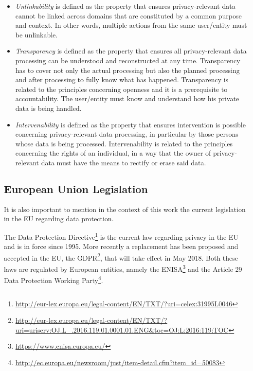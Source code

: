 \begin{itemize}
\setlength\itemsep{1em}


\item \textit{Unlinkability} is defined as the property that ensures privacy-relevant data cannot be linked across domains that are constituted by a common purpose and context. In other words, multiple actions from the same user/entity must be unlinkable.

\item \textit{Transparency} is defined as the property that ensures all privacy-relevant data processing can be understood and reconstructed at any time. Transparency has to cover not only the actual processing but also the planned processing and after processing to fully know what has happened. Transparency is related to the principles concerning openness and it is a prerequisite to accountability. The user/entity must know and understand how his private data is being handled.

\item \textit{Intervenability} is defined as the property that ensures intervention is possible concerning privacy-relevant data processing, in particular by those persons whose data is being processed. Intervenability is related to the principles concerning the rights of an individual, in a way that the owner of privacy-relevant data must have the means to rectify or erase said data.

\end{itemize}


\subsection{European Union Legislation}
\label{ssec:EuropeanUnionLegislation}

It is also important to mention in the context of this work the current legislation in the \ac{EU} regarding data protection.

 The Data Protection Directive\footnote{\url{http://eur-lex.europa.eu/legal-content/EN/TXT/?uri=celex:31995L0046}} is the current law regarding privacy in the \ac{EU} and is in force since 1995.
More recently a replacement has been proposed and accepted in the \ac{EU}, the \ac{GDPR}\footnote{\url{http://eur-lex.europa.eu/legal-content/EN/TXT/?uri=uriserv:OJ.L_.2016.119.01.0001.01.ENG&toc=OJ:L:2016:119:TOC}}, that will take effect in May 2018. Both these laws are regulated by European entities, namely the \ac{ENISA}\footnote{\url{https://www.enisa.europa.eu/}} and the Article 29 Data Protection Working Party\footnote{\url{http://ec.europa.eu/newsroom/just/item-detail.cfm?item_id=50083}}.


